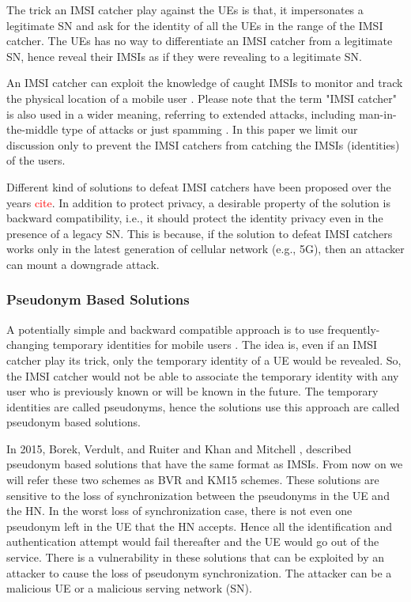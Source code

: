 \documentclass{llncs} %
\begin{document}
The trick an IMSI catcher play against the UEs is that, it impersonates a legitimate SN and ask for the identity of all the UEs in the range of the IMSI catcher. The UEs has no way to differentiate an IMSI catcher from a legitimate SN, hence reveal their IMSIs as if they were revealing to a legitimate SN. 

An IMSI catcher can exploit the knowledge of caught IMSIs to monitor and track the physical location of a mobile user \cite{tracking_bins,goldman2007mobile}. Please note that the term "IMSI catcher" is also used in a wider meaning, referring to extended attacks, including man-in-the-middle type of attacks or just spamming \cite{catch_me_if_you_can,chinese_spam}. In this paper we limit our discussion only to prevent the IMSI catchers from catching the IMSIs (identities) of the users.

Different kind of solutions to defeat IMSI catchers have been proposed over the years \textcolor{red}{cite}. In addition to protect privacy, a desirable property of the solution is backward compatibility, i.e., it should protect the identity privacy even in the presence of a legacy SN. This is because, if the solution to defeat IMSI catchers works only in the latest generation of cellular network (e.g., 5G), then an attacker can mount a downgrade attack. 

\subsubsection{Pseudonym Based Solutions}
A potentially simple and backward compatible approach is to use frequently-changing temporary identities for mobile users \cite{CCS15,SSR15,Ginzboorg_Niemi_2016,Norrman_Naslund_Dubrova_2016,yemen2017}. The idea is, even if an IMSI catcher play its trick, only the temporary identity of a UE would be revealed. So, the IMSI catcher would not be able to associate the temporary identity with any user who is previously known or will be known in the future. The temporary identities are called pseudonyms, hence the solutions use this approach are called pseudonym based solutions. 

In 2015, Borek, Verdult, and Ruiter \cite{CCS15} and Khan and Mitchell \cite{SSR15}, described pseudonym based solutions that have the same format as IMSIs. From now on we will refer these two schemes as BVR and KM15 schemes. These solutions are sensitive to the loss of synchronization between the pseudonyms in the UE and the HN. In the worst loss of synchronization case, there is not even one pseudonym left in the UE that the HN accepts. Hence all the identification and authentication attempt would fail thereafter and the UE would go out of the service. There is a vulnerability in these solutions that can be exploited by an attacker to cause the loss of pseudonym synchronization. The attacker can be a malicious UE or a malicious serving network (SN).
\end{document}
